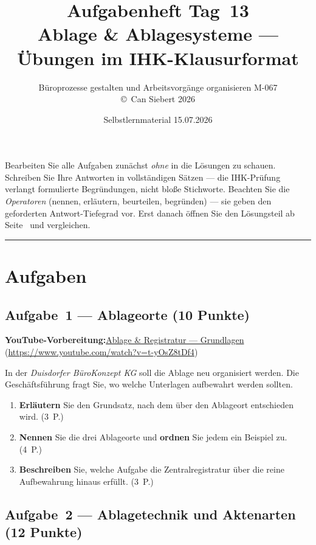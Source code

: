 \documentclass[11pt, a4paper]{article}
\title{\vspace*{-1.5cm}\Huge\bfseries\color{bfwPrimaryDark}Aufgabenheft Tag~13\\[0.4em]
  \large\color{bfwInkSoft}\textnormal{Ablage \& Ablagesysteme --- Übungen im IHK-Klausurformat}}
\author{\textsf{Büroprozesse gestalten und Arbeitsvorgänge organisieren \textperiodcentered{} M-067}\\
\textsf{\small\copyright\ Can Siebert\,\textperiodcentered\,2026}}
\date{Selbstlernmaterial \textperiodcentered{} 15.07.2026}
\begin{document}
\maketitle
\thispagestyle{empty}

\begin{merksatz}[title={\bfseries So nutzen Sie dieses Aufgabenheft}]
Bearbeiten Sie alle Aufgaben zunächst \emph{ohne} in die Lösungen zu schauen. Schreiben
Sie Ihre Antworten in vollständigen Sätzen --- die IHK-Prüfung verlangt formulierte
Begründungen, nicht bloße Stichworte. Beachten Sie die \emph{Operatoren} (nennen,
erläutern, beurteilen, begründen) --- sie geben den geforderten Antwort-Tiefegrad vor.
Erst danach öffnen Sie den Lösungsteil ab Seite~\pageref{loesungen} und vergleichen.
\end{merksatz}

\tableofcontents
\vspace{1em}
\hrule

\section{Aufgaben}

\subsection*{Aufgabe~1 --- Ablageorte (10 Punkte)}

\noindent\textbf{\color{bfwAccent}YouTube-Vorbereitung:}\enspace \href{https://www.youtube.com/watch?v=t-yOsZ8tDf4}{Ablage \& Registratur --- Grundlagen} (\url{https://www.youtube.com/watch?v=t-yOsZ8tDf4})

\medskip
In der \emph{Duisdorfer BüroKonzept KG} soll die Ablage neu organisiert werden. Die
Geschäftsführung fragt Sie, wo welche Unterlagen aufbewahrt werden sollten.

\begin{enumerate}[label=(\alph*)]
  \item \textbf{Erläutern} Sie den Grundsatz, nach dem über den Ablageort entschieden wird. \hfill (3~P.)
  \item \textbf{Nennen} Sie die drei Ablageorte und \textbf{ordnen} Sie jedem ein Beispiel zu. \hfill (4~P.)
  \item \textbf{Beschreiben} Sie, welche Aufgabe die Zentralregistratur über die reine Aufbewahrung hinaus erfüllt. \hfill (3~P.)
\end{enumerate}

\subsection*{Aufgabe~2 --- Ablagetechnik und Aktenarten (12 Punkte)}
\end{document}
